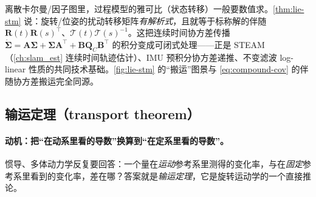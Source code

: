 \begin{insight}[为什么 $\boldsymbol{\Phi}=\mathbf{R}(t)\mathbf{R}(s)^\top$ 是连续时间 SLAM 的命门]
离散卡尔曼/因子图里，过程模型的雅可比（状态转移）一般要数值求。\cref{thm:lie-stm} 说：旋转/位姿的扰动转移矩阵\emph{有解析式}，且就等于标称解的伴随 $\mathbf{R}(t)\mathbf{R}(s)^\top$、$\boldsymbol{\mathcal{T}}(t)\boldsymbol{\mathcal{T}}(s)^{-1}$。这把连续时间协方差传播 $\dot{\boldsymbol{\Sigma}}=\mathbf{A}\boldsymbol{\Sigma}+\boldsymbol{\Sigma}\mathbf{A}^\top+\mathbf{B}\mathbf{Q}_C\mathbf{B}^\top$ 的积分变成可闭式处理——正是 STEAM（\cref{ch:slam_est} 连续时间轨迹估计）、IMU 预积分协方差递推、不变滤波 log-linear 性质的共同技术基础。\cref{fig:lie-stm} 的“搬运”图景与 \cref{eq:compound-cov} 的伴随协方差搬运完全同源。
\end{insight}

\subsection{输运定理（transport theorem）}
\label{subsec:lie-transport}

\paragraph{动机：把“在动系里看的导数”换算到“在定系里看的导数”。}惯导、多体动力学反复要回答：一个量在\emph{运动}参考系里测得的变化率，与在\emph{固定}参考系里看到的变化率，差在哪？答案就是\emph{输运定理}，它是旋转运动学的一个直接推论。

